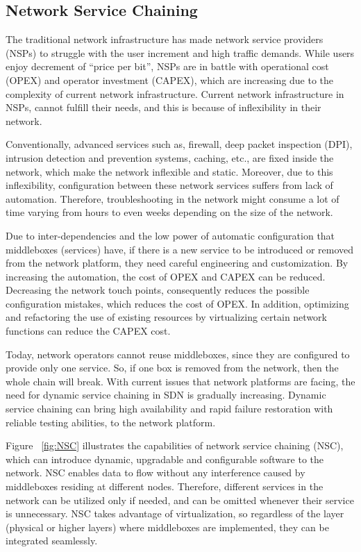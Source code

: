 \subsection{Network Service Chaining}

The traditional network infrastructure has made network service providers (NSPs) to struggle with the user increment and high traffic demands. While users enjoy decrement of “price per bit”, NSPs are in battle with operational cost (OPEX) and operator investment (CAPEX), which are increasing due to the complexity of current network infrastructure. Current network infrastructure in NSPs, cannot fulfill their needs, and this is because of inflexibility in their network. \cite{Wol13}

Conventionally, advanced services such as, firewall, deep packet inspection (DPI), intrusion detection and prevention systems, caching, etc., are fixed inside the network, which make the network inflexible and static. Moreover, due to this inflexibility, configuration between these network services suffers from lack of automation. Therefore, troubleshooting in the network might consume a lot of time varying from hours to even weeks depending on the size of the network. 

Due to inter-dependencies and the low power of automatic configuration that middleboxes (services) have, if there is a new service to be introduced or removed from the network platform, they need careful engineering and customization. By increasing the automation, the cost of OPEX and CAPEX can be reduced. Decreasing the network touch points, consequently reduces the possible configuration mistakes, which reduces the cost of OPEX. In addition, optimizing and refactoring the use of existing resources by virtualizing certain network functions can reduce the CAPEX cost. 

Today, network operators cannot reuse middleboxes, since they are configured to provide only one service. So, if one box is removed from the network, then the whole chain will break. With current issues that network platforms are facing, the need for dynamic service chaining in SDN is gradually increasing. Dynamic service chaining can bring high availability and rapid failure restoration with reliable testing abilities, to the network platform. 

Figure ~\ref{fig:NSC} illustrates the capabilities of network service chaining (NSC), which can introduce dynamic, upgradable and configurable software to the network. NSC enables data to flow without any interference caused by middleboxes residing at different nodes. Therefore, different services in the network can be utilized only if needed, and can be omitted whenever their service is unnecessary. NSC takes advantage of virtualization, so regardless of the layer (physical or higher layers) where middleboxes are implemented, they can be integrated seamlessly. 
       
